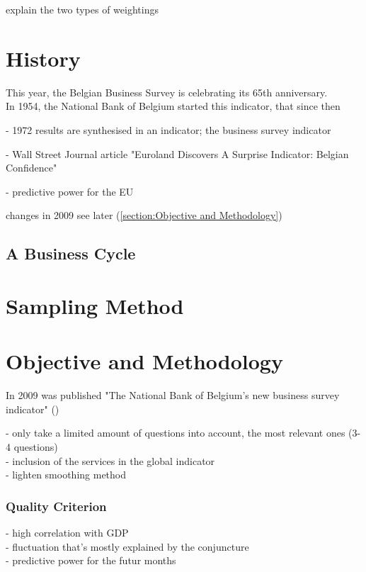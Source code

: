 \documentclass[12pt,a4paper,oneside]{book}
\begin{document}
explain the two types of weightings

\section{History}

This year, the Belgian Business Survey is celebrating its 65th anniversary. \\
In 1954, the National Bank of Belgium started this indicator, that since then 

- 1972 results are synthesised in an indicator; the business survey indicator

- Wall Street Journal article "Euroland Discovers A Surprise Indicator: Belgian Confidence" \citep{rhoads_euroland_1999}

- predictive power for the EU \cite{vanhaelen_belgian_2000}

changes in 2009 see later (\autoref{section:Objective and Methodology})

\subsection{A Business Cycle}




\section{Sampling Method}




\section{Objective and Methodology}
\label{section:Objective and Methodology}
In 2009 was published "The National Bank of Belgium’s new business survey indicator" 
(\citeauthor{de_greef_national_2009})



- only take a limited amount of questions into account, the most relevant ones (3-4 questions) \\
- inclusion of the services in the global indicator \\
- lighten smoothing method



\subsubsection{Quality Criterion}
- high correlation with GDP \\
- fluctuation that's mostly explained by the conjuncture\\
- predictive power for the futur months 
\end{document}
